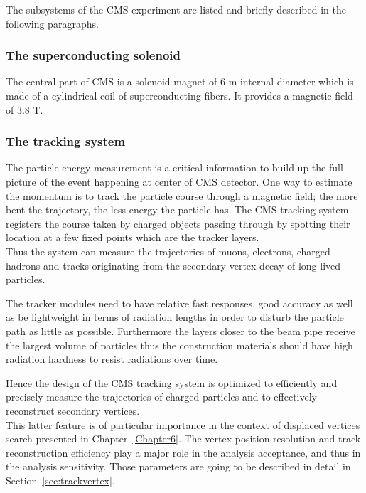 The subsystems of the CMS experiment are listed and briefly described
in the following paragraphs.

\subsubsection{The superconducting solenoid}
The central part of CMS is a solenoid magnet of 6 m internal diameter
which is made of a cylindrical coil of superconducting fibers. It 
provides a magnetic field of 3.8 T. 
\subsubsection{The tracking system}\label{sec:tracking}
The particle energy measurement is a critical information to build up the full
picture of the event happening at center of CMS detector. One way to
estimate the momentum is to track the particle course through a
magnetic field; the more bent the trajectory, the less energy the
particle has. The CMS tracking system registers the course taken by
charged objects passing through by spotting their location at a few
fixed points which are the tracker layers. \\
Thus the system can measure the trajectories of muons, electrons,
charged hadrons and tracks originating from the secondary vertex decay of long-lived
particles.

The tracker modules need to have relative fast responses, good
accuracy as well as be lightweight in terms of radiation lengths in
order to disturb the particle path as little as possible. Furthermore
the layers closer to the beam pipe receive
the largest volume of particles thus the construction materials should
have high radiation hardness to resist radiations over time.

Hence the design of the CMS tracking system is optimized to
efficiently and precisely measure the trajectories of charged
particles and to effectively reconstruct secondary vertices.\\
This latter feature is of particular
importance in the context of displaced vertices search presented
in Chapter~\ref{Chapter6}. The vertex position resolution and track
reconstruction efficiency play a major role in the analysis acceptance,
and thus in the analysis sensitivity. Those parameters are going to be
described in detail in Section~\ref{sec:trackvertex}.

